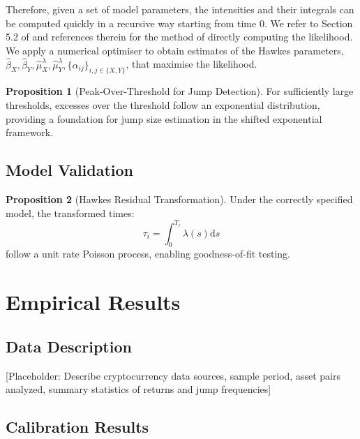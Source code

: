 \documentclass{article}
\newcommand{\diff}{\mathrm{d}}
\theoremstyle{definition}
\newtheorem{proposition}{Proposition}[section]
\begin{document}
Therefore, given a set of model parameters, the intensities and their integrals can be computed quickly in a recursive way starting from time 0. We refer to Section 5.2 of \cite{laub2021elements} and references therein for the method of directly computing the likelihood.
We apply a numerical optimiser to obtain estimates of the Hawkes parameters, $\hat \beta_X, \hat \beta_Y, \hat \mu_X^\lambda, \hat \mu_Y^\lambda, \{\hat \alpha_{ij}\}_{i,j \in \{X,Y\}}$, that maximise the likelihood.

\begin{proposition}[Peak-Over-Threshold for Jump Detection]
\label{prop:pot}
For sufficiently large thresholds, excesses over the threshold follow an exponential distribution, providing a foundation for jump size estimation in the shifted exponential framework.
\end{proposition}

\subsection{Model Validation}

\begin{proposition}[Hawkes Residual Transformation]
\label{prop:residuals}
Under the correctly specified model, the transformed times:
\begin{equation}
\tau_i = \int_0^{T_i} \lambda(s) \diff s
\end{equation}
follow a unit rate Poisson process, enabling goodness-of-fit testing.
\end{proposition}

\section{Empirical Results}

\subsection{Data Description}

[Placeholder: Describe cryptocurrency data sources, sample period, asset pairs analyzed, summary statistics of returns and jump frequencies]

\subsection{Calibration Results}
\end{document}

